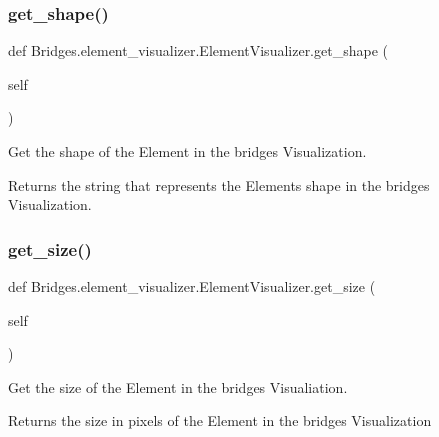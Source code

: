 \subsubsection{\texorpdfstring{get\+\_\+shape()}{get\_shape()}}
{\footnotesize\ttfamily def Bridges.\+element\+\_\+visualizer.\+Element\+Visualizer.\+get\+\_\+shape (\begin{DoxyParamCaption}\item[{}]{self }\end{DoxyParamCaption})}



Get the shape of the Element in the bridges Visualization. 

\begin{DoxyReturn}{Returns}
the string that represents the Element\textquotesingle{}s shape in the bridges Visualization. 
\end{DoxyReturn}
\mbox{\label{class_bridges_1_1element__visualizer_1_1_element_visualizer_a43e24d7977692b676da745c9a775c2d7}} 
\subsubsection{\texorpdfstring{get\+\_\+size()}{get\_size()}}
{\footnotesize\ttfamily def Bridges.\+element\+\_\+visualizer.\+Element\+Visualizer.\+get\+\_\+size (\begin{DoxyParamCaption}\item[{}]{self }\end{DoxyParamCaption})}



Get the size of the Element in the bridges Visualiation. 

\begin{DoxyReturn}{Returns}
the size in pixels of the Element in the bridges Visualization 
\end{DoxyReturn}
\mbox{\label{class_bridges_1_1element__visualizer_1_1_element_visualizer_a5dceeba34842559488e0fca0013d97eb}} 
